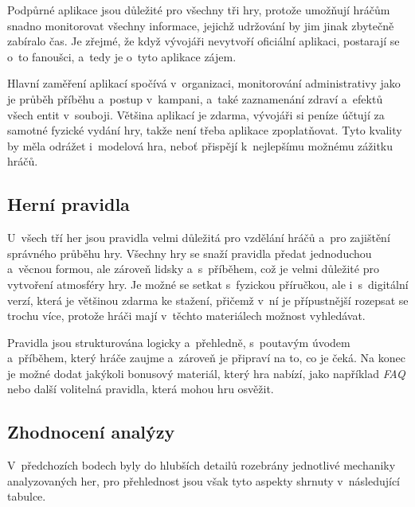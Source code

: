 Podpůrné aplikace jsou důležité pro všechny tři hry, protože umožňují hráčům snadno monitorovat všechny informace, jejichž udržování by jim jinak zbytečně zabíralo čas. Je zřejmé, že když vývojáři nevytvoří oficiální aplikaci, postarají se o~to fanoušci, a~tedy je o~tyto aplikace zájem. 

Hlavní zaměření aplikací spočívá v~organizaci, monitorování administrativy jako je průběh příběhu a~postup v~kampani, a~také zaznamenání zdraví a~efektů všech entit v~souboji. Většina aplikací je zdarma, vývojáři si peníze účtují za samotné fyzické vydání hry, takže není třeba aplikace zpoplatňovat. Tyto kvality by měla odrážet i~modelová hra, neboť přispějí k~nejlepšímu možnému zážitku hráčů.

\subsection{Herní pravidla}
\label{subsec:comparison_rules}

U~všech tří her jsou pravidla velmi důležitá pro vzdělání hráčů a~pro zajištění správného průběhu hry. Všechny hry se snaží pravidla předat jednoduchou a~věcnou formou, ale zároveň lidsky a~s~příběhem, což je velmi důležité pro vytvoření atmosféry hry. Je možné se setkat s~fyzickou příručkou, ale i~s~digitální verzí, která je většinou zdarma ke stažení, přičemž v~ní je přípustnější rozepsat se trochu více, protože hráči mají v~těchto materiálech možnost vyhledávat.

Pravidla jsou strukturována logicky a~přehledně, s~poutavým úvodem a~příběhem, který hráče zaujme a~zároveň je připraví na to, co je čeká. Na konec je možné dodat jakýkoli bonusový materiál, který hra nabízí, jako například \textit{FAQ} nebo další volitelná pravidla, která mohou hru osvěžit.

\subsection{Zhodnocení analýzy}
\label{subsec:comparison_conclusion}

V~předchozích bodech byly do hlubších detailů rozebrány jednotlivé mechaniky analyzovaných her, pro přehlednost jsou však tyto aspekty shrnuty v~následující tabulce.

